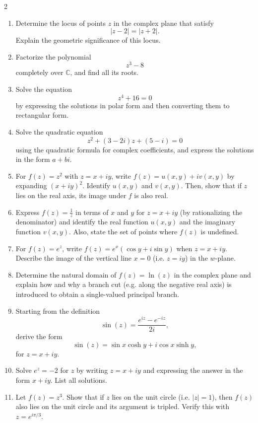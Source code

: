 \begin{multicols}{2}
\begin{enumerate}
\item Determine the locus of points \( z \) in the complex plane that satisfy
\[
|z-2|=|z+2|.
\]
Explain the geometric significance of this locus.

\item Factorize the polynomial
\[
z^3-8
\]
completely over \(\mathbb{C}\), and find all its roots.

\item Solve the equation
\[
z^4+16=0
\]
by expressing the solutions in polar form and then converting them to rectangular form.

\item Solve the quadratic equation
\[
z^2+(3-2i)z+(5-i)=0
\]
using the quadratic formula for complex coefficients, and express the solutions in the form \( a+bi \).


\item
For \( f(z)=z^2 \) with \( z=x+iy \), write \( f(z)=u(x,y)+iv(x,y) \) by expanding \((x+iy)^2\). Identify \( u(x,y) \) and \( v(x,y) \). Then, show that if \( z \) lies on the real axis, its image under \( f \) is also real.

\item 
Express \( f(z)=\frac{1}{z} \) in terms of \( x \) and \( y \) for \( z=x+iy \) (by rationalizing the denominator) and identify the real function \( u(x,y) \) and the imaginary function \( v(x,y) \). Also, state the set of points where \( f(z) \) is undefined.

\item 
For \( f(z)=e^z \), write \( f(z)=e^x(\cos y + i\sin y) \) when \( z=x+iy \). Describe the image of the vertical line \( x=0 \) (i.e. \( z=iy \)) in the \( w \)-plane.

\item 
Determine the natural domain of \( f(z)=\ln(z) \) in the complex plane and explain how and why a branch cut (e.g. along the negative real axis) is introduced to obtain a single-valued principal branch.

\item 
Starting from the definition
\[
\sin(z)=\frac{e^{iz}-e^{-iz}}{2i},
\]
derive the form 
\[
\sin(z)=\sin x \cosh y + i\cos x \sinh y,
\]
for \( z=x+iy \).

\item 
Solve \( e^{z}=-2 \) for \( z \) by writing \( z=x+iy \) and expressing the answer in the form \( x+iy \). List all solutions.

\item 
Let \( f(z)=z^3 \). Show that if \( z \) lies on the unit circle (i.e. \( |z|=1 \)), then \( f(z) \) also lies on the unit circle and its argument is tripled. Verify this with \( z=e^{i\pi/3} \).


\end{enumerate}
\end{multicols}
